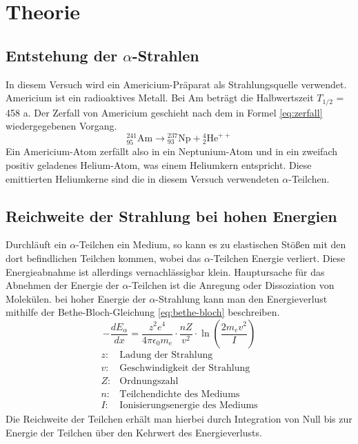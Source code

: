 
\section{Theorie}

\subsection{Entstehung der $\alpha$-Strahlen}

In diesem Versuch wird ein Americium-Präparat als Strahlungsquelle
verwendet. Americium ist ein radioaktives Metall. Bei Am beträgt die
Halbwertszeit $T_{1/2}$ = 458 a. Der Zerfall von Americium geschieht
nach dem in Formel \eqref{eq:zerfall} wiedergegebenen Vorgang.
\begin{equation}
  \label{eq:zerfall}
  {}^{241}_{95}\mathrm{Am} \longrightarrow {}^{237}_{93}\mathrm{Np} +
  {}^{4}_{2}\mathrm{He}^{++}
\end{equation}
Ein Americium-Atom zerfällt also in ein Neptunium-Atom und in ein
zweifach positiv geladenes Helium-Atom, was einem Heliumkern
entspricht. Diese emittierten Heliumkerne sind die in diesem Versuch
verwendeten $\alpha$-Teilchen.

\subsection{Reichweite der Strahlung bei hohen Energien}

Durchläuft ein $\alpha$-Teilchen ein Medium, so kann es zu elastischen
Stößen mit den dort befindlichen Teilchen kommen, wobei das
$\alpha$-Teilchen Energie verliert. Diese Energieabnahme ist allerdings
vernachlässigbar klein. Hauptursache für das Abnehmen der Energie der
$\alpha$-Teilchen ist die Anregung oder Dissoziation von Molekülen. bei
hoher Energie der $\alpha$-Strahlung kann man den Energieverlust
mithilfe der Bethe-Bloch-Gleichung \eqref{eq:bethe-bloch} beschreiben.
\begin{equation}
  \label{eq:bethe-bloch}
  -\frac{d E_\alpha}{dx} = \frac{z^2 e^4}{4 \pi \epsilon_0 m_e} \cdot 
  \frac{n Z}{v^2} \cdot \ln \left(\frac{2 m_e v^2}{I}\right)
\end{equation}
\begin{align*}
  z\colon &\text{Ladung der Strahlung}\\
  v\colon &\text{Geschwindigkeit der Strahlung}\\
  Z\colon &\text{Ordnungszahl}\\ 
  n\colon &\text{Teilchendichte des Mediums}\\
  I\colon &\text{Ionisierungsenergie des Mediums}
\end{align*}
Die Reichweite der Teilchen erhält man hierbei durch Integration von Null bis zur Energie der Teilchen über den Kehrwert des Energieverlusts.

